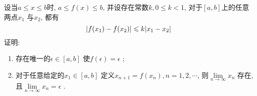 \begin{question}
    设当$ a \le x \le b $时, $ a \le f(x) \le b $, 并设存在常数$ k, 0 \le k < 1 $, 对于$ [a, b] $上的任意两点$ x_1 $ 与$ x_2 $, 都有
    \begin{equation*}
        \lvert f(x_1) - f(x_2) \rvert \leqslant k \lvert x_1 - x_2 \rvert
    \end{equation*}
    证明:
    \begin{enumerate}
        \item 存在唯一的$ \epsilon \in [a, b] $ 使$ f(\epsilon) = \epsilon $ ;
        \item 对于任意给定的$ x_1 \in [a, b] $ 定义$ x_{n + 1} = f(x_n), n = 1,2,\cdots $, 则$ \lim\limits_{n \to \infty} x_n $ 存在, 且$ \lim\limits_{n \to \infty} x_n = \epsilon $ . 
    \end{enumerate}      
\end{question}